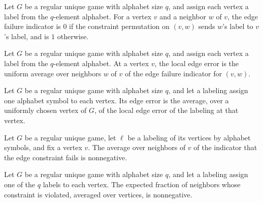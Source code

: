 \begin{definition}
\label{FABL.RegularUniqueGame.edgeFailureIndicator}
\leanok
Let $G$ be a regular unique game with alphabet size $q$, and assign each vertex a label
from the $q$-element alphabet. For a vertex $v$ and a neighbor $w$ of $v$, the edge
failure indicator is $0$ if the constraint permutation on $(v,w)$ sends $w$'s label to
$v$'s label, and is $1$ otherwise.
\end{definition}

\begin{definition}
\label{FABL.RegularUniqueGame.localEdgeError}
\leanok
{}
Let $G$ be a regular unique game with alphabet size $q$, and assign each vertex a label
from the $q$-element alphabet. At a vertex $v$, the local edge error is the uniform
average over neighbors $w$ of $v$ of the edge failure indicator for $(v,w)$.
\end{definition}

\begin{definition}
\label{FABL.RegularUniqueGame.edgeError}
\leanok
{}
Let $G$ be a regular unique game with alphabet size $q$, and let a labeling assign one
alphabet symbol to each vertex. Its edge error is the average, over a uniformly chosen
vertex of $G$, of the local edge error of the labeling at that vertex.
\end{definition}

\begin{theorem}
\label{FABL.RegularUniqueGame.localEdgeError_nonneg}
\leanok
{}
Let $G$ be a regular unique game, let $\ell$ be a labeling of its vertices by alphabet
symbols, and fix a vertex $v$. The average over neighbors of $v$ of the indicator that
the edge constraint fails is nonnegative.
\end{theorem}

\begin{theorem}
\label{FABL.RegularUniqueGame.edgeError_nonneg}
\leanok
{}
Let $G$ be a regular unique game with alphabet size $q$, and let a labeling assign one
of the $q$ labels to each vertex. The expected fraction of neighbors whose constraint is
violated, averaged over vertices, is nonnegative.
\end{theorem}


